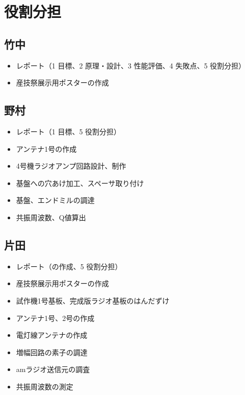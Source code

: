 \documentclass[report.tex]{subfiles}
\begin{document}
\section{役割分担}

\subsection{竹中}

\begin{itemize}
	\item レポート（1 目標、2 原理・設計、3 性能評価、4 失敗点、5 役割分担）
	\item 産技祭展示用ポスターの作成
\end{itemize}

\subsection{野村}

\begin{itemize}
	\item レポート（1 目標、5 役割分担）
	\item アンテナ1号の作成
	\item 4号機ラジオアンプ回路設計、制作
	\item 基盤への穴あけ加工、スペーサ取り付け
	\item 基盤、エンドミルの調達
	\item 共振周波数、Q値算出
\end{itemize}

\subsection{片田}

\begin{itemize}
	\item レポート（の作成、5 役割分担）
	\item 産技祭展示用ポスターの作成
	\item 試作機1号基板、完成版ラジオ基板のはんだずけ
	\item アンテナ1号、2号の作成
	\item 電灯線アンテナの作成
	\item 増幅回路の素子の調達
	\item amラジオ送信元の調査
	\item 共振周波数の測定
\end{itemize}
\end{document}
